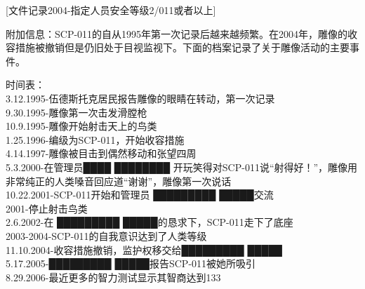[文件记录2004-指定人员安全等级2\slash011或者以上]

附加信息：SCP-011的自从1995年第一次记录后越来越频繁。在2004年，雕像的收容措施被撤销但是仍旧处于目视监视下。下面的档案记录了关于雕像活动的主要事件。

\begin{scpbox}

时间表：\\
3.12.1995-伍德斯托克居民报告雕像的眼睛在转动，第一次记录\\
9.30.1995-雕像第一次击发滑膛枪\\
10.9.1995-雕像开始射击天上的鸟类\\
1.25.1996-编级为SCP-011，开始收容措施\\
4.14.1997-雕像被目击到偶然移动和张望四周\\
5.3.2000-在管理员████ ████████ 开玩笑得对SCP-011说“射得好！”，雕像用非常纯正的人类嗓音回应道“谢谢”，雕像第一次说话\\
10.22.2001-SCP-011开始和管理员 █████████ █████交流\\
2001-停止射击鸟类\\
2.6.2002-在 █████████ █████的恳求下，SCP-011走下了底座\\
2003-2004-SCP-011的自我意识达到了人类等级\\
11.10.2004-收容措施撤销，监护权移交给█████████ █████\\
5.17.2005-█████████ █████报告SCP-011被她所吸引\\
8.29.2006-最近更多的智力测试显示其智商达到133

\end{scpbox}

